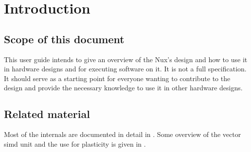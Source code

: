 \chapter{Introduction}

\section{Scope of this document}
This user guide intends to give an overview of the Nux's design and how to use it in hardware designs and for executing software on it.
It is not a full specification.
It should serve as a starting point for everyone wanting to contribute to the design and provide the necessary knowledge to use it in other hardware designs.


\section{Related material}
Most of the internals are documented in detail in \cite{friedmann13phd}.
Some overview of the vector \gls{simd} unit and the use for plasticity is given in \cite{dlspaper15}.

